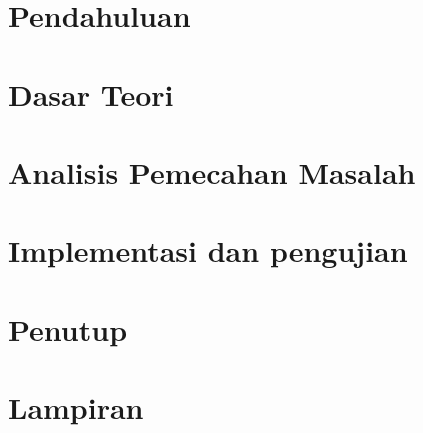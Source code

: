 \documentclass[12pt,a4paper]{report}
\begin{document}
	\chapter{Pendahuluan}
	
	
	\chapter{Dasar Teori}
	
	
	\chapter{Analisis Pemecahan Masalah}
	
	
	\chapter{Implementasi dan pengujian}
	
	
	\chapter{Penutup}
	

	\chapter{Lampiran}
	
	
	
	
\end{document}
